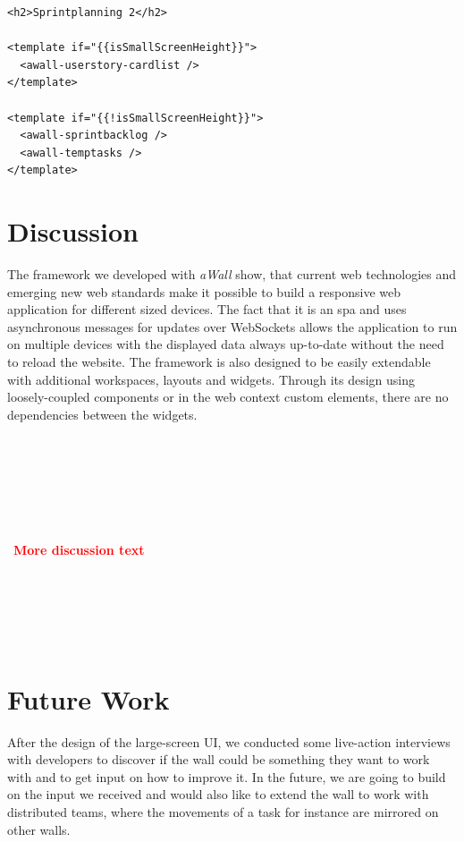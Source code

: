 \documentclass{sigchi}
\newcommand\todo[1]{~\\\\~\\~\\~\\~\\~\textbf{\huge{\textcolor{red}{#1}}}\\~\\~\\~\\~\\~}
\begin{document}
\begin{lstlisting}
<h2>Sprintplanning 2</h2>

<template if="{{isSmallScreenHeight}}">
  <awall-userstory-cardlist />
</template>

<template if="{{!isSmallScreenHeight}}">
  <awall-sprintbacklog />
  <awall-temptasks />
</template>
\end{lstlisting}


\section{Discussion}

The framework we developed with \textit{aWall} show, that current web technologies and emerging new web standards make it possible to build a responsive web application for different sized devices. 
The fact that it is an \gls{spa} and uses asynchronous messages for updates over WebSockets allows the application to run on multiple devices with the displayed data always up-to-date without the need to reload the website.
The framework is also designed to be easily extendable with additional workspaces, layouts and widgets.
Through its design using loosely-coupled components or in the web context custom elements, there are no dependencies between the widgets.

\todo{More discussion text}






\section{Future Work}
After the design of the large-screen UI, we conducted some live-action interviews with developers to discover if the wall could be something they want to work with and to get input on how to improve it.
In the future, we are going to build on the input we received and would also like to extend the wall to work with distributed teams, where the movements  of a task for instance are mirrored on other walls.



\balance{}



\end{document}
